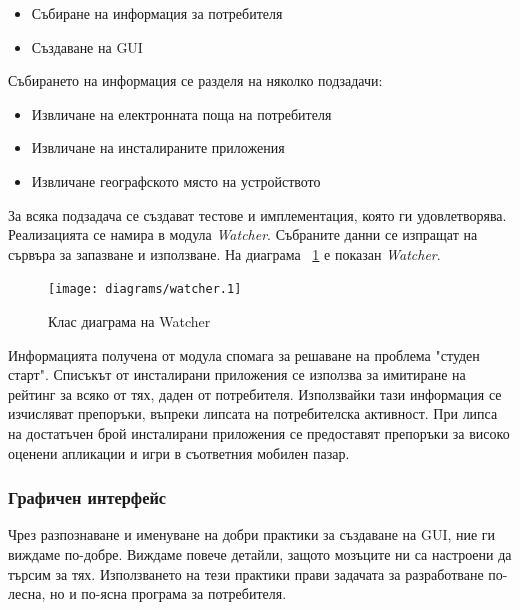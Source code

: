 		\begin{itemize}
			\item Събиране на информация за потребителя
			\item Създаване на \ac{GUI}
		\end{itemize}
		
		Събирането на информация се разделя на няколко подзадачи:
		
		\begin{itemize}
			\item Извличане на електронната поща на потребителя
			\item Извличане на инсталираните приложения
			\item Извличане географското място на устройството
		\end{itemize}

		За всяка подзадача се създават тестове и имплементация, която ги удовлетворява. Реализацията се намира в модула \emph{Watcher}. Събраните данни се изпращат на сървъра за запазване и използване. На диаграма ~\ref{figure:watcher} е показан \emph{Watcher}.

		\vspace{2em}

		\begin{figure}[htbp]
			\centering
 			\texttt{[image: diagrams/watcher.1]}
			\caption{Клас диаграма на Watcher}
			\label{figure:watcher}
		\end{figure}
		
		\vspace{2em}
		
		Информацията получена от модула спомага за решаване на проблема "студен старт". Списъкът от инсталирани приложения се използва за имитиране на рейтинг за всяко от тях, даден от потребителя. Използвайки тази информация се изчисляват препоръки, въпреки липсата на потребителска активност. При липса на достатъчен брой инсталирани приложения се предоставят препоръки за високо оценени апликации и игри в съответния мобилен пазар.
		
		\subsubsection{Графичен интерфейс}		
		
		Чрез разпознаване и именуване на добри практики за създаване на \ac{GUI}, ние ги виждаме по-добре. Виждаме повече детайли, защото мозъците ни са настроени да търсим за тях.\cite{Tidwell} Използването на тези практики прави задачата за разработване по-лесна, но и по-ясна програма за потребителя.
		
